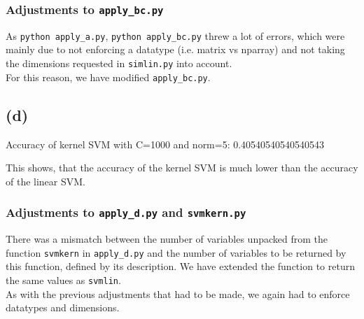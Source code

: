 \subsubsection*{Adjustments to \texttt{apply\_bc.py}}
As \texttt{python apply\_a.py}, \texttt{python apply\_bc.py} threw a lot of errors, which were mainly due to not enforcing a datatype (i.e. matrix vs nparray) and not taking the dimensions requested in \texttt{simlin.py} into account.\\

For this reason, we have modified \texttt{apply\_bc.py}.

\subsection*{(d)}
Accuracy of kernel SVM with C=1000 and norm=5: 0.40540540540540543

This shows, that the accuracy of the kernel SVM is much lower than the accuracy of the linear SVM.

\subsubsection*{Adjustments to \texttt{apply\_d.py} and \texttt{svmkern.py}}
There was a mismatch between the number of variables unpacked from the function \texttt{svmkern} in \texttt{apply\_d.py} and the number of variables to be returned by this function, defined by its description. We have extended the function to return the same values as \texttt{svmlin}.\\
As with the previous adjustments that had to be made, we again had to enforce datatypes and dimensions.